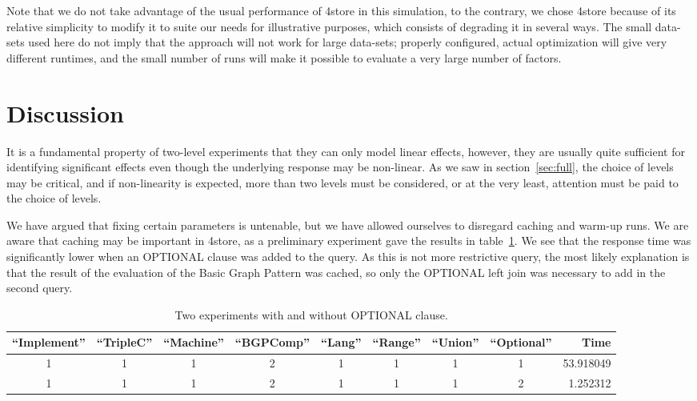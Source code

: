 \documentclass{llncs}
\begin{document}
Note that we do not take advantage of the usual performance of 4store
in this simulation, to the contrary, we chose 4store because of its
relative simplicity to modify it to suite our needs for illustrative
purposes, which consists of degrading it in several ways. The small
data-sets used here do not imply that the approach will not work for
large data-sets; properly configured, actual optimization will give
very different runtimes, and the small number of runs will make it
possible to evaluate a very large number of factors.



\section{Discussion}

It is a fundamental property of two-level experiments that they can
only model linear effects, however, they are usually quite sufficient
for identifying significant effects even though the underlying
response may be non-linear.  As we saw in section~\ref{sec:full}, the
choice of levels may be critical, and if non-linearity is expected,
more than two levels must be considered, or at the very least,
attention must be paid to the choice of levels.

We have argued that fixing certain parameters is untenable, but we
have allowed ourselves to disregard caching and warm-up runs. We are
aware that caching may be important in 4store, as a preliminary
experiment gave the results in table~\ref{tab:cacheexp}. We see that the
response time was significantly lower when an OPTIONAL clause was
added to the query. As this is not more restrictive query, the most
likely explanation is that the result of the evaluation of the Basic
Graph Pattern was cached, so only the OPTIONAL left join was necessary
to add in the second query.

\begin{table}[ht]
\begin{center}
\caption{Two experiments with and without OPTIONAL clause.}\label{tab:cacheexp}
\begin{tabular}{ccccccccr}
  \hline
``Implement'' & ``TripleC'' & ``Machine'' & ``BGPComp'' & ``Lang'' & ``Range'' & ``Union'' & ``Optional'' & Time \\
 \hline
1   &    1  &     1  &     2 &   1 &    1   &  1  & 1 &  53.918049 \\
1   &    1  &     1  &     2 &   1 &    1   &  1  & 2 &   1.252312 \\
   \hline
\end{tabular}
\end{center}
\end{table}
\end{document}
